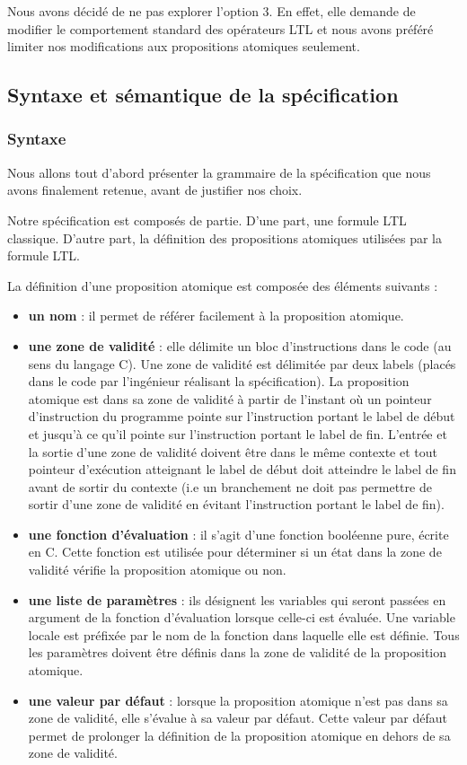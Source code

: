 Nous avons décidé de ne pas explorer l'option 3. En effet, elle demande
de modifier le comportement standard des opérateurs LTL et nous avons
préféré limiter nos modifications aux propositions atomiques seulement.

\subsection{Syntaxe et sémantique de la spécification}

\subsubsection{Syntaxe}

Nous allons tout d'abord présenter la grammaire de la spécification que
nous avons finalement retenue, avant de justifier nos choix.

Notre spécification est composés de partie. D'une part, une formule LTL
classique. D'autre part, la définition des propositions atomiques utilisées
par la formule LTL.

La définition d'une proposition atomique est composée des éléments suivants :

\begin{itemize}
\item
  \textbf{un nom} : il permet de référer facilement à la proposition atomique.
\item
  \textbf{une zone de validité} : elle délimite un bloc d'instructions dans
  le code (au sens du langage C). Une zone de validité est délimitée par deux
  labels (placés dans le code par l'ingénieur réalisant la spécification). La
  proposition atomique est dans sa zone de validité à partir de l'instant où un
  pointeur d'instruction du programme pointe sur l'instruction portant le label
  de début et jusqu'à ce qu'il pointe sur l'instruction portant le label de fin.
  L'entrée et la sortie d'une zone de validité doivent être dans le même
  contexte et tout pointeur d'exécution atteignant le label de début doit
  atteindre le label de fin avant de sortir du contexte (i.e un branchement ne
  doit pas permettre de sortir d'une zone de validité en évitant l'instruction
  portant le label de fin).
\item
  \textbf{une fonction d'évaluation} : il s'agit d'une fonction booléenne pure,
  écrite en C. Cette fonction est utilisée pour déterminer si un état
  dans la zone de validité vérifie la proposition atomique ou non.
\item
\textbf{une liste de paramètres} : ils désignent les variables qui seront
  passées en argument de la fonction d'évaluation lorsque celle-ci est évaluée.
  Une variable locale est préfixée par le nom de la fonction dans laquelle elle
  est définie. Tous les paramètres doivent être définis dans la zone de validité
  de la proposition atomique.
\item
  \textbf{une valeur par défaut} : lorsque la proposition atomique n'est pas dans
  sa zone de validité, elle s'évalue à sa valeur par défaut. Cette valeur par
  défaut permet de prolonger la définition de la proposition atomique en dehors
  de sa zone de validité.
\end{itemize}


